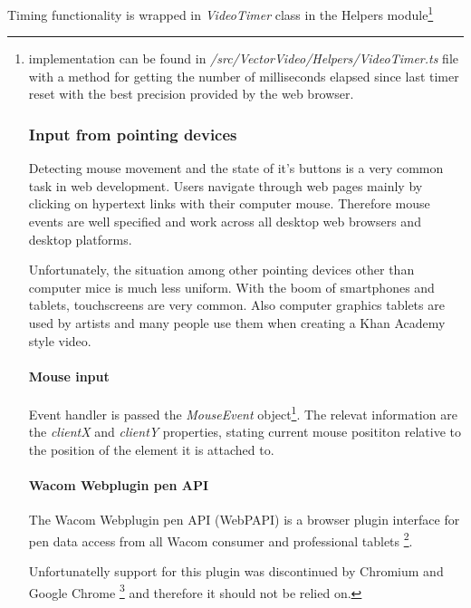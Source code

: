 Timing functionality is wrapped in \textit{VideoTimer} class in the Helpers module\footnote{implementation can be found in \textit{/src/VectorVideo/Helpers/VideoTimer.ts} file with a method for getting the number of milliseconds elapsed since last timer reset with the best precision provided by the web browser.






\subsubsection{Input from pointing devices}

Detecting mouse movement and the state of it's buttons is a very common task in web development. Users navigate through web pages mainly by clicking on hypertext links with their computer mouse. Therefore mouse events are well specified and work across all desktop web browsers and desktop platforms.

Unfortunately, the situation among other pointing devices other than computer mice is much less uniform. With the boom of smartphones and tablets, touchscreens are very common. Also computer graphics tablets are used by artists and many people use them when creating a Khan Academy style video.

\paragraph{Mouse input}
Event handler is passed the \textit{MouseEvent} object\footnote{http://www.w3.org/TR/DOM-Level-2-Events/events.html#Events-MouseEvent}. The relevat information are the \textit{clientX} and \textit{clientY} properties, stating current mouse posititon relative to the position of the element it is attached to. 

\paragraph{Wacom Webplugin pen API}
The Wacom Webplugin pen API (WebPAPI) is a browser plugin interface for pen data access from all Wacom consumer and professional tablets \cite{}\footnote{http://www.wacomeng.com/web/WebPluginReleaseNotes.htm}.

Unfortunatelly support for this plugin was discontinued by Chromium and Google Chrome \footnote{http://blog.chromium.org/2013/09/saying-goodbye-to-our-old-friend-npapi.htm} and therefore it should not be relied on.

}
